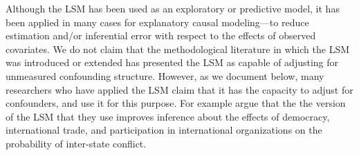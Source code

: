 \documentclass[11pt]{article}
\begin{document}


Although the LSM has been used as an exploratory or predictive
model, it has been applied in many cases for explanatory causal
modeling---to reduce estimation and/or inferential error with respect
to the effects of observed covariates. We do not claim that the
methodological literature in which the LSM was introduced or extended
has presented the LSM as capable of adjusting for unmeasured
confounding structure. However, as we document below, many researchers
who have applied the LSM claim that it has the capacity to adjust for
confounders, and use it for this purpose. For example
\citet{ward2007disputes} argue that the
the version of the LSM that they use improves inference about the effects of democracy,
international trade, and participation in international organizations
on the probability of inter-state conflict.
\end{document}
